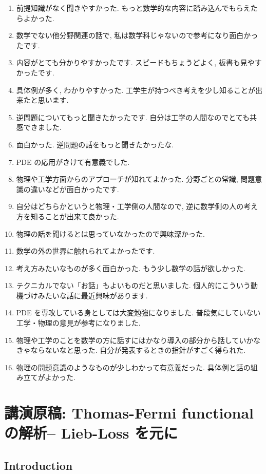 \documentclass[openany, a4paper, oneside]{jsbook}
\begin{document}
\begin{enumerate}
\item 前提知識がなく聞きやすかった.
もっと数学的な内容に踏み込んでもらえたらよかった.
\item 数学でない他分野関連の話で, 私は数学科じゃないので参考になり面白かったです.
\item 内容がとても分かりやすかったです.
スピードもちょうどよく, 板書も見やすかったです.
\item 具体例が多く, わかりやすかった.
工学生が持つべき考えを少し知ることが出来たと思います.
\item 逆問題についてもっと聞きたかったです. 自分は工学の人間なのでとても共感できました.
\item 面白かった. 逆問題の話をもっと聞きたかったな.
\item PDE の応用がきけて有意義でした.
\item 物理や工学方面からのアプローチが知れてよかった.
分野ごとの常識, 問題意識の違いなどが面白かったです.
\item 自分はどちらかというと物理・工学側の人間なので, 逆に数学側の人の考え方を知ることが出来て良かった.
\item 物理の話を聞けるとは思っていなかったので興味深かった.
\item 数学の外の世界に触れられてよかったです.
\item 考え方みたいなものが多く面白かった. もう少し数学の話が欲しかった.
\item テクニカルでない「お話」もよいものだと思いました. 個人的にこういう動機づけみたいな話に最近興味があります.
\item PDE を専攻している身としては大変勉強になりました.
普段気にしていない工学・物理の意見が参考になりました.
\item 物理や工学のことを数学の方に話すにはかなり導入の部分から話していかなきゃならないなと思った.
自分が発表するときの指針がすごく得られた.
\item 物理の問題意識のようなものが少しわかって有意義だった.
具体例と話の組み立てがよかった.
\end{enumerate}
\chapter{講演原稿: Thomas-Fermi functional の解析-- Lieb-Loss \cite{LiebLoss1} を元に}

\section{Introduction}
\end{document}
